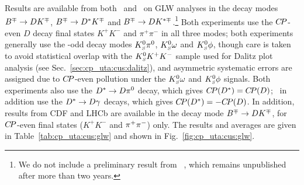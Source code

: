 \label{sec:cp_uta:cus:glw}

Results are available from both \babar\ and \belle\ on GLW analyses in the
decay modes $B^\mp \to DK^\mp$, $B^\mp \to D^*K^\mp$ and 
$B^\mp \to DK^{*\mp}$.\footnote{
  We do not include a preliminary result from \belle~\cite{Abe:2003rg}, which
  remains unpublished after more than two years.
}
Both experiments use the $C\!P$-even $D$ decay final states $K^+K^-$ and
$\pi^+\pi^-$ in all three modes; both experiments generally use the \CP-odd
decay modes $K^0_{\scriptscriptstyle S}\pi^0$, $K^0_{\scriptscriptstyle S}\omega$ and $K^0_{\scriptscriptstyle S}\phi$, though care is taken to
avoid statistical overlap with the $K^0_{\scriptscriptstyle S} K^+K^-$ sample used for Dalitz plot
analysis (see Sec.~\ref{sec:cp_uta:cus:dalitz}), 
and asymmetric systematic errors are assigned due to $C\!P$-even pollution
under the $K^0_{\scriptscriptstyle S}\omega$ and $K^0_{\scriptscriptstyle S}\phi$ signals.
Both experiments also use the $D^* \to D\pi^0$ decay, 
which gives $C\!P(D^*) = C\!P(D)$;
\babar\ in addition use the $D^* \to D\gamma$ decays, 
which gives $C\!P(D^*) = -C\!P(D)$.
In addition, results from CDF and LHCb are available in the
decay mode $B^\mp \to DK^\mp$, 
for $C\!P$-even final states ($K^+K^-$ and $\pi^+\pi^-$) only.
The results and averages are given in Table~\ref{tab:cp_uta:cus:glw}
and shown in Fig.~\ref{fig:cp_uta:cus:glw}.




